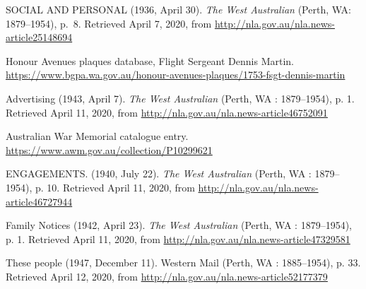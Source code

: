 \begin{thebibliography}{999}
	SOCIAL AND PERSONAL (1936, April 30). \emph{The West Australian} (Perth, WA: 1879--1954), p.~8.
	Retrieved April 7, 2020, from \url{http://nla.gov.au/nla.news-article25148694}

	Honour Avenues plaques database, Flight Sergeant Dennis Martin.
	\url{https://www.bgpa.wa.gov.au/honour-avenues-plaques/1753-fsgt-dennis-martin}

	Advertising (1943, April 7). \emph{The West Australian} (Perth, WA : 1879--1954), p. 1.
	Retrieved April 11, 2020, from \url{http://nla.gov.au/nla.news-article46752091}

	Australian War Memorial catalogue entry.
	\url{https://www.awm.gov.au/collection/P10299621}

	ENGAGEMENTS. (1940, July 22). \emph{The West Australian} (Perth, WA : 1879--1954), p. 10.
	Retrieved April 11, 2020, from \url{http://nla.gov.au/nla.news-article46727944}

	Family Notices (1942, April 23). \emph{The West Australian} (Perth, WA : 1879--1954), p. 1.
	Retrieved April 11, 2020, from \url{http://nla.gov.au/nla.news-article47329581}

	These people (1947, December 11). Western Mail (Perth, WA : 1885--1954), p. 33.
	Retrieved April 12, 2020, from \url{http://nla.gov.au/nla.news-article52177379}

\end{thebibliography}
